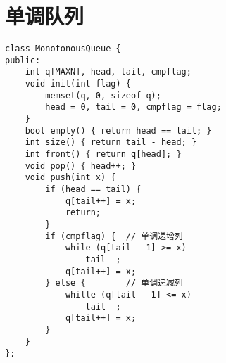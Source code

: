 \section{单调队列}
\begin{verbatim}
class MonotonousQueue {
public:
    int q[MAXN], head, tail, cmpflag;
    void init(int flag) {
        memset(q, 0, sizeof q);
        head = 0, tail = 0, cmpflag = flag;
    }
    bool empty() { return head == tail; }
    int size() { return tail - head; }
    int front() { return q[head]; }
    void pop() { head++; }
    void push(int x) {
        if (head == tail) {
            q[tail++] = x;
            return;
        }
        if (cmpflag) {  // 单调递增列 
            while (q[tail - 1] >= x)
                tail--;
            q[tail++] = x;
        } else {        // 单调递减列 
            whille (q[tail - 1] <= x)
                tail--;
            q[tail++] = x;
        }
    }
};    
\end{verbatim}